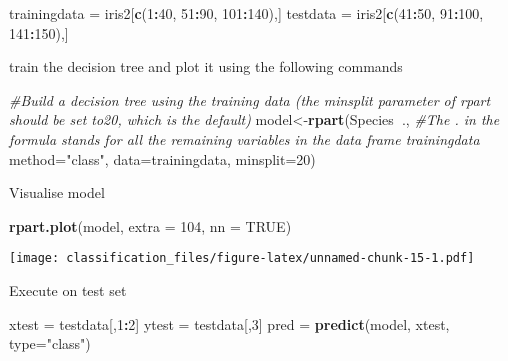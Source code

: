 \documentclass[]{article}
\newenvironment{Shaded}{\begin{snugshade}}{\end{snugshade}}
\newcommand{\CommentTok}[1]{\textcolor[rgb]{0.56,0.35,0.01}{\textit{#1}}}
\newcommand{\DataTypeTok}[1]{\textcolor[rgb]{0.13,0.29,0.53}{#1}}
\newcommand{\DecValTok}[1]{\textcolor[rgb]{0.00,0.00,0.81}{#1}}
\newcommand{\KeywordTok}[1]{\textcolor[rgb]{0.13,0.29,0.53}{\textbf{#1}}}
\newcommand{\NormalTok}[1]{#1}
\newcommand{\OperatorTok}[1]{\textcolor[rgb]{0.81,0.36,0.00}{\textbf{#1}}}
\newcommand{\OtherTok}[1]{\textcolor[rgb]{0.56,0.35,0.01}{#1}}
\newcommand{\StringTok}[1]{\textcolor[rgb]{0.31,0.60,0.02}{#1}}
\begin{document}
\begin{Shaded}
\begin{Highlighting}[]
\NormalTok{trainingdata =}\StringTok{ }\NormalTok{iris2[}\KeywordTok{c}\NormalTok{(}\DecValTok{1}\OperatorTok{:}\DecValTok{40}\NormalTok{, }\DecValTok{51}\OperatorTok{:}\DecValTok{90}\NormalTok{, }\DecValTok{101}\OperatorTok{:}\DecValTok{140}\NormalTok{),]}
\NormalTok{testdata =}\StringTok{ }\NormalTok{iris2[}\KeywordTok{c}\NormalTok{(}\DecValTok{41}\OperatorTok{:}\DecValTok{50}\NormalTok{, }\DecValTok{91}\OperatorTok{:}\DecValTok{100}\NormalTok{, }\DecValTok{141}\OperatorTok{:}\DecValTok{150}\NormalTok{),]}
\end{Highlighting}
\end{Shaded}

train the decision tree and plot it using the following commands

\begin{Shaded}
\begin{Highlighting}[]
\CommentTok{#Build a decision tree using the training data (the minsplit parameter of rpart should be set to20, which is the default)}
\NormalTok{model<-}\KeywordTok{rpart}\NormalTok{(Species}\OperatorTok{~}\NormalTok{., }\CommentTok{#The . in the formula stands for all the remaining variables in the data frame trainingdata}
             \DataTypeTok{method=}\StringTok{"class"}\NormalTok{,}
             \DataTypeTok{data=}\NormalTok{trainingdata,}
             \DataTypeTok{minsplit=}\DecValTok{20}\NormalTok{)}
\end{Highlighting}
\end{Shaded}

Visualise model

\begin{Shaded}
\begin{Highlighting}[]
\KeywordTok{rpart.plot}\NormalTok{(model, }\DataTypeTok{extra =} \DecValTok{104}\NormalTok{, }\DataTypeTok{nn =} \OtherTok{TRUE}\NormalTok{)}
\end{Highlighting}
\end{Shaded}

\texttt{[image: classification\_files/figure-latex/unnamed-chunk-15-1.pdf]}

Execute on test set

\begin{Shaded}
\begin{Highlighting}[]
\NormalTok{xtest =}\StringTok{ }\NormalTok{testdata[,}\DecValTok{1}\OperatorTok{:}\DecValTok{2}\NormalTok{]}
\NormalTok{ytest =}\StringTok{ }\NormalTok{testdata[,}\DecValTok{3}\NormalTok{]}
\NormalTok{pred =}\StringTok{ }\KeywordTok{predict}\NormalTok{(model, xtest, }\DataTypeTok{type=}\StringTok{"class"}\NormalTok{)}
\end{Highlighting}
\end{Shaded}
\end{document}
